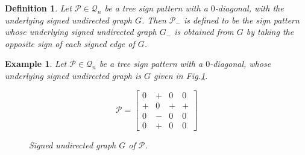 \documentclass[10pt,a4paper]{amsart}
\newtheorem{definition}{Definition}[section]
\newtheorem{eg}{Example}[section]
\numberwithin{equation}{section}
\begin{document}
	
	
	
	\begin{definition}
		Let $\mathcal{P}\in \mathcal{Q}_n$ be a tree sign pattern with a $0$-diagonal, with the underlying signed undirected graph $G$. Then $\mathcal{P}_-$ is defined to be the sign pattern whose underlying signed undirected graph $G_-$ is obtained from $G$ by taking the opposite sign of each signed edge of $G$.
	\end{definition}
	
	\begin{eg} Let $\mathcal{P}\in \mathcal{Q}_n$ be a tree sign pattern with a $0$-diagonal, whose underlying signed undirected graph is $G$  given in Fig.\ref{figx1}.
		\begin{figure}[H]
			\centering
			\begin{minipage}{.45\textwidth}
				\vspace{-1cm}
				\[
				\mathcal{P}=\begin{bmatrix}
					0 & + & 0 & 0 \\
					+ & 0 & + & + \\
					0 & - & 0 & 0 \\
					0 & + & 0 & 0
				\end{bmatrix}
				\]
			\end{minipage}
			\hspace{0.05\textwidth}
			\begin{minipage}{.45\textwidth}
				\centering
				\tikzset{node distance=1cm}
				\caption{Signed undirected graph $ G$ of $\mathcal{P}$.}
				\label{figx1}
			\end{minipage}
		\end{figure}
		
		
		

\end{eg}
\end{document}
